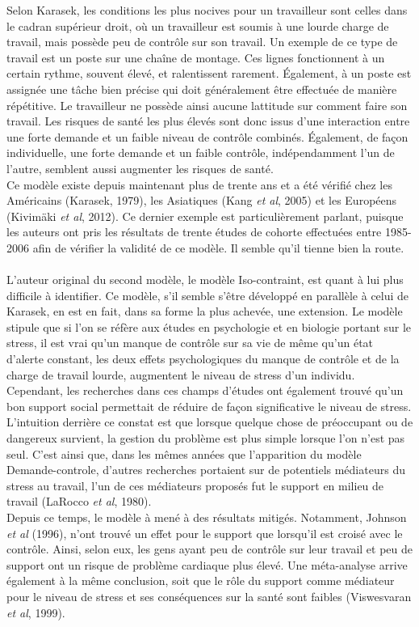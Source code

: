 \documentclass[a4paper, oneside, titlepage]{article}
\begin{document}
Selon Karasek, les conditions les plus nocives pour un travailleur sont celles dans le cadran supérieur droit, où un travailleur est soumis à une lourde charge de travail, mais possède peu de contrôle sur son travail. Un exemple de ce type de travail est un poste sur une chaîne de montage. Ces lignes fonctionnent à un certain rythme, souvent élevé, et ralentissent rarement. Également, à un poste est assignée une tâche bien précise qui doit généralement être effectuée de manière répétitive. Le travailleur ne possède ainsi aucune lattitude sur comment faire son travail. Les risques de santé les plus élevés sont donc issus d'une interaction entre une forte demande et un faible niveau de contrôle combinés. Également, de façon individuelle, une forte demande et un faible contrôle, indépendamment l'un de l'autre, semblent aussi augmenter les risques de santé. 
\\
Ce modèle existe depuis maintenant plus de trente ans et a été vérifié chez les Américains (Karasek, 1979), les Asiatiques (Kang \textit{et al}, 2005) et les Européens (Kivimäki \textit{et al}, 2012). Ce dernier exemple est particulièrement parlant, puisque les auteurs ont pris les résultats de trente études de cohorte effectuées entre 1985-2006 afin de vérifier la validité de ce modèle. Il semble qu'il tienne bien la route.
\\
\\
L'auteur original du second modèle, le modèle Iso-contraint, est quant à lui plus difficile à identifier. Ce modèle, s'il semble s'être développé en parallèle à celui de Karasek, en est en fait, dans sa forme la plus achevée, une extension. Le modèle stipule que si l'on se réfère aux études en psychologie et en biologie portant sur le stress, il est vrai qu'un manque de contrôle sur sa vie de même qu'un état d'alerte constant, les deux effets psychologiques du manque de contrôle et de la charge de travail lourde, augmentent le niveau de stress d'un individu. Cependant, les recherches dans ces champs d'études ont également trouvé qu'un bon support social permettait de réduire de façon significative le niveau de stress. L'intuition derrière ce constat est que lorsque quelque chose de préoccupant ou de dangereux survient, la gestion du problème est plus simple lorsque l'on n'est pas seul. C'est ainsi que, dans les mêmes années que l'apparition du modèle Demande-controle, d'autres recherches portaient sur de potentiels médiateurs du stress au travail, l'un de ces médiateurs proposés fut le support en milieu de travail (LaRocco \textit{et al}, 1980).
\\
Depuis ce temps, le modèle à mené à des résultats mitigés. Notamment, Johnson \textit{et al} (1996), n'ont trouvé un effet pour le support que lorsqu'il est croisé avec le contrôle. Ainsi, selon eux, les gens ayant peu de contrôle sur leur travail et peu de support ont un risque de problème cardiaque plus élevé. Une méta-analyse arrive également à la même conclusion, soit que le rôle du support comme médiateur pour le niveau de stress et ses conséquences sur la santé sont faibles (Viswesvaran \textit{et al}, 1999).
\end{document}
